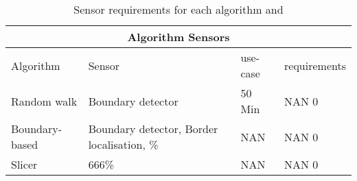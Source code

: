 \begin{table}[ht]
\begin{adjustbox}{max width=0.5\textwidth, center }
    \centering
    \begin{tabular}{|p{2.5cm}||p{2cm}|p{1.5cm}|p{1.5cm}|}
    
    \hline
    \multicolumn{4}{|c|}{Algorithm Sensors} \\
    \hline
    Algorithm & Sensor & use-case &requirements\\
    \hline
    Random walk & Boundary detector & 50 Min &NAN   0\\
    Boundary-based &Boundary detector, Border localisation, \%& NAN&  NAN   0\\
    Slicer&666\%& NAN&  NAN   0\\
    \hline
    \end{tabular}
\end{adjustbox}
\captionsetup{justification=centering,margin=0cm}
\caption{Sensor requirements for each algorithm and }
\label{tab:sensor}
\end{table}